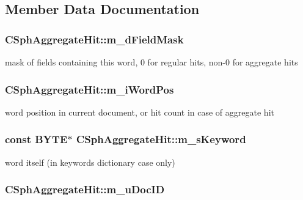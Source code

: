 \subsection{Member Data Documentation}
\hypertarget{structCSphAggregateHit_a87b97f5d6e3838790db7ef4773eeac67}{
\subsubsection[{m\-\_\-d\-Field\-Mask}]{ C\-Sph\-Aggregate\-Hit\-::m\-\_\-d\-Field\-Mask}}\label{structCSphAggregateHit_a87b97f5d6e3838790db7ef4773eeac67}


mask of fields containing this word, 0 for regular hits, non-\/0 for aggregate hits 

\hypertarget{structCSphAggregateHit_a99f49fe08e3fb20ee11c5217803067b3}{
\subsubsection[{m\-\_\-i\-Word\-Pos}]{ C\-Sph\-Aggregate\-Hit\-::m\-\_\-i\-Word\-Pos}}\label{structCSphAggregateHit_a99f49fe08e3fb20ee11c5217803067b3}


word position in current document, or hit count in case of aggregate hit 

\hypertarget{structCSphAggregateHit_aa66adfd392df1239428349d0c9a78349}{
\subsubsection[{m\-\_\-s\-Keyword}]{\setlength{\rightskip}{0pt plus 5cm}const {\bf B\-Y\-T\-E}$\ast$ C\-Sph\-Aggregate\-Hit\-::m\-\_\-s\-Keyword}}\label{structCSphAggregateHit_aa66adfd392df1239428349d0c9a78349}


word itself (in keywords dictionary case only) 

\hypertarget{structCSphAggregateHit_aebd6323792225cc1ccdbd29cd841fe1f}{
\subsubsection[{m\-\_\-u\-Doc\-I\-D}]{ C\-Sph\-Aggregate\-Hit\-::m\-\_\-u\-Doc\-I\-D}}\label{structCSphAggregateHit_aebd6323792225cc1ccdbd29cd841fe1f}


